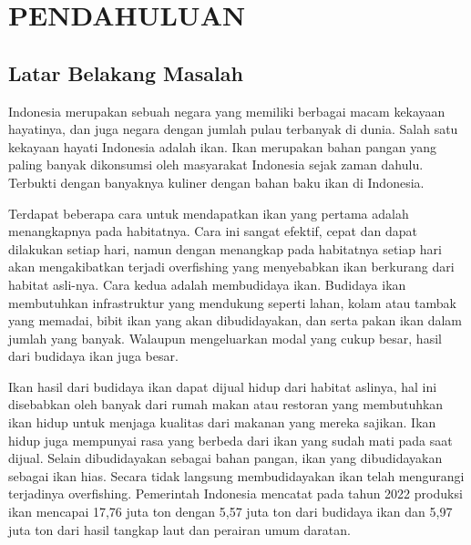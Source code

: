 
\chapter{PENDAHULUAN}

\section{Latar Belakang Masalah}

Indonesia merupakan sebuah negara yang memiliki berbagai macam kekayaan hayatinya, dan juga negara dengan jumlah pulau terbanyak di dunia. 
Salah satu kekayaan hayati Indonesia adalah ikan. Ikan merupakan bahan pangan yang paling banyak dikonsumsi oleh masyarakat Indonesia sejak zaman dahulu. 
Terbukti dengan banyaknya kuliner dengan bahan baku ikan di Indonesia.

Terdapat beberapa cara untuk mendapatkan ikan yang pertama adalah menangkapnya pada habitatnya. 
Cara ini sangat efektif, cepat dan dapat dilakukan setiap hari, namun dengan menangkap pada habitatnya setiap hari akan mengakibatkan terjadi overfishing yang menyebabkan ikan berkurang dari habitat asli-nya. 
Cara kedua adalah membudidaya ikan. Budidaya ikan membutuhkan infrastruktur yang mendukung seperti lahan, kolam atau tambak yang memadai, bibit ikan yang akan dibudidayakan, dan serta pakan ikan dalam jumlah yang banyak. 
Walaupun mengeluarkan modal yang cukup besar, hasil dari budidaya ikan juga besar. 

Ikan hasil dari budidaya ikan dapat dijual hidup dari habitat aslinya, hal ini disebabkan oleh banyak dari rumah makan atau restoran yang membutuhkan ikan hidup untuk menjaga kualitas dari makanan yang mereka sajikan. 
Ikan hidup juga mempunyai rasa yang berbeda dari ikan yang sudah mati pada saat dijual. Selain dibudidayakan sebagai bahan pangan, ikan yang dibudidayakan sebagai ikan hias. 
Secara tidak langsung membudidayakan ikan telah mengurangi terjadinya overfishing. 
Pemerintah Indonesia mencatat pada tahun 2022 produksi ikan mencapai 17,76 juta ton dengan 5,57 juta ton dari budidaya ikan dan 5,97 juta ton dari hasil tangkap laut dan perairan umum daratan.

